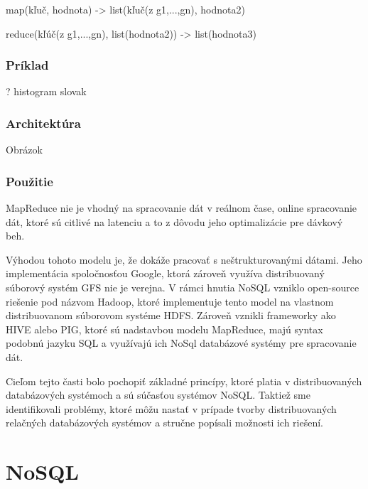 \documentclass[11pt,twoside,a4paper]{book}
\begin{document}
map(kľuč, hodnota) -> list(kľuč(z g1,...,gn), hodnota2)

reduce(kľúč(z g1,...,gn), list(hodnota2)) -> list(hodnota3)

\subsection{Príklad}
? histogram slovak

\subsection{Architektúra}
Obrázok

\subsection{Použitie}

MapReduce nie je vhodný na spracovanie dát v reálnom čase, online spracovanie dát, ktoré sú citlivé na latenciu a to z dôvodu jeho optimalizácie pre dávkový beh.

Výhodou tohoto modelu je, že dokáže pracovať s neštrukturovanými dátami. Jeho implementácia spoločnosťou Google, ktorá zároveň využíva distribuovaný súborový systém GFS nie je verejna. V rámci hnutia NoSQL vzniklo open-source riešenie pod názvom Hadoop, ktoré implementuje tento model na vlastnom distribuovanom súborovom systéme HDFS. Zároveň vznikli frameworky ako HIVE alebo PIG, ktoré sú nadstavbou modelu MapReduce, majú syntax podobnú  jazyku SQL a využívajú ich NoSql databázové systémy pre spracovanie dát. 


\noindent Cieľom tejto časti bolo pochopiť základné princípy, ktoré platia v distribuovaných databázových systémoch a sú súčasťou systémov NoSQL. Taktiež sme identifikovali problémy, ktoré môžu nastať v prípade tvorby distribuovaných relačných databázových systémov a stručne popísali možnosti ich riešení.


\chapter{NoSQL}

% 

% 
\end{document}
